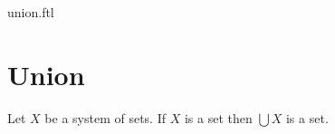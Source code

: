 \documentclass{naproche-library}
\begin{document}
\begin{smodule}{union.ftl}

  \section{Union}

  \begin{axiom}[forthel,title=Union Axiom,id=FOUNDATIONS_10_5536459412996096]
    Let $X$ be a system of sets.
    If $X$ is a set then $\bigcup X$ is a set.
  \end{axiom}
\end{smodule}
\end{document}
